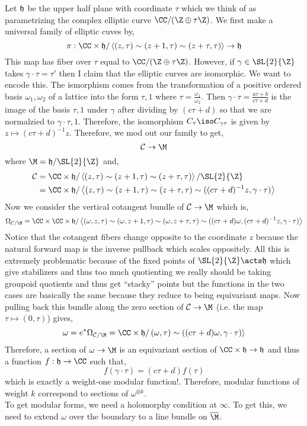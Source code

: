 \documentclass[12pt]{article}
\begin{document}
Let $\mathfrak{h}$ be the upper half plane with coordinate $\tau$ which we think of as parametrizing the complex elliptic curve $\CC / (\Z \oplus \tau \Z)$. We first make a universal family of elliptic cuves by,
\[ \pi : \CC \times \h / \left< (z, \tau) \sim (z + 1, \tau) \sim (z + \tau, \tau) \right> \to \h \]
This map has fiber over $\tau$ equal to $\CC / (\Z \oplus \tau \Z)$. However, if $\gamma \in \SL{2}{\Z}$ takes $\gamma \cdot \tau = \tau'$ then I claim that the elliptic curves are isomorphic. We want to encode this. The ismorphism comes from the transformation of a positive ordered basis $\omega_1, \omega_2$ of a lattice into the form $\tau, 1$ where $\tau = \frac{\omega_1}{\omega_2}$. Then $\gamma \cdot \tau = \frac{a \tau + b}{c \tau + d}$ is the image of the basis $\tau, 1$ under $\gamma$ after dividing by $(c \tau + d)$ so that we are normalzied to $\gamma \cdot \tau, 1$. Therefore, the isomorphism $C_\tau \iso C_{\gamma \tau}$ is given by $z \mapsto (c \tau + d)^{-1} z$. Therefore, we mod out our family to get,
\[ \C \to \M \]
where $\M = \h / \SL{2}{\Z}$ and,
\begin{align*}
\C & = \CC \times \h / \left< (z, \tau) \sim (z + 1, \tau) \sim (z + \tau, \tau) \right> / \SL{2}{\Z} 
\\
& = \CC \times \h / \left< (z, \tau) \sim (z + 1, \tau) \sim (z + \tau, \tau) \sim ((c \tau + d)^{-1} z, \gamma \cdot \tau) \right>
\end{align*}
Now we consider the vertical cotangent bundle of $\C \to \M$ which is,
\[ \Omega_{\C/\M} = \CC \times \CC \times \h / \left< (\omega, z, \tau) \sim (\omega, z + 1, \tau) \sim (\omega, z + \tau, \tau) \sim ((c\tau + d) \omega, (c \tau + d)^{-1} z, \gamma \cdot \tau) \right> \]
Notice that the cotangent fibers change opposite to the coordinate $z$ because the natural forward map is the inverse pullback which scales oppositely. 
All this is extremely problematic because of the fixed points of $\SL{2}{\Z} \acts \h$ which give stabilizers and thus too much quotienting we really should be taking groupoid quotients and thus get ``stacky'' points but the functions in the two cases are basically the same because they reduce to being equivariant maps. 
Now pulling back this bundle along the zero section of $\C \to \M$ (i.e. the map $\tau \mapsto (0, \tau)$) gives,
\[ \omega = e^* \Omega_{\C/\M} = \CC \times \h / \left (\omega, \tau) \sim ((c \tau + d) \omega, \gamma \cdot \tau) \right> \]
Therefore, a section of $\omega \to \M$ is an equivariant section of $\CC \times \h \to \h$ and thus a function $f : \h \to \CC$ such that,
\[ f(\gamma \cdot \tau) = (c \tau + d) f(\tau) \]
which is exactly a weight-one modular function!. Therefore, modular functions of weight $k$ correspond to sections of $\omega^{\otimes k}$. 
\bigskip\\
To get modular forms, we need a holomorphy condition at $\infty$. To get this, we need to extend $\omega$ over the boundary to a line bundle on $\overline{\M}$. 
\end{document}
